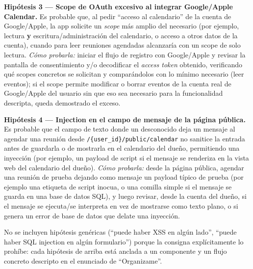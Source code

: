 \textbf{Hipótesis 3 --- Scope de OAuth excesivo al integrar Google/Apple Calendar.} Es
probable que, al pedir ``acceso al calendario'' de la cuenta de Google/Apple, la app
solicite un \emph{scope} más amplio del necesario (por ejemplo, lectura \textbf{y}
escritura/administración del calendario, o acceso a otros datos de la cuenta), cuando para
leer reuniones agendadas alcanzaría con un scope de solo lectura.
\emph{Cómo probarla:} iniciar el flujo de registro con Google/Apple y revisar la pantalla
de consentimiento y/o decodificar el \emph{access token} obtenido, verificando qué scopes
concretos se solicitan y comparándolos con lo mínimo necesario (leer eventos); si el scope
permite modificar o borrar eventos de la cuenta real de Google/Apple del usuario sin que
eso sea necesario para la funcionalidad descripta, queda demostrado el exceso.

\textbf{Hipótesis 4 --- Injection en el campo de mensaje de la página pública.} Es probable
que el campo de texto donde un desconocido deja un mensaje al agendar una reunión desde
\texttt{/\{user\_id\}/public/calendar} no sanitice la entrada antes de guardarla o de
mostrarla en el calendario del dueño, permitiendo una inyección (por ejemplo, un payload de
script si el mensaje se renderiza en la vista web del calendario del dueño).
\emph{Cómo probarla:} desde la página pública, agendar una reunión de prueba dejando como
mensaje un payload típico de prueba (por ejemplo una etiqueta de script inocua, o una
comilla simple si el mensaje se guarda en una base de datos SQL), y luego revisar, desde la
cuenta del dueño, si el mensaje se ejecuta/se interpreta en vez de mostrarse como texto
plano, o si genera un error de base de datos que delate una inyección.

\begin{ojo}
No se incluyen hipótesis genéricas (``puede haber XSS en algún lado'', ``puede haber SQL
injection en algún formulario'') porque la consigna explícitamente lo prohíbe: cada
hipótesis de arriba está anclada a un componente y un flujo concreto descripto en el
enunciado de ``Organizame''.
\end{ojo}
